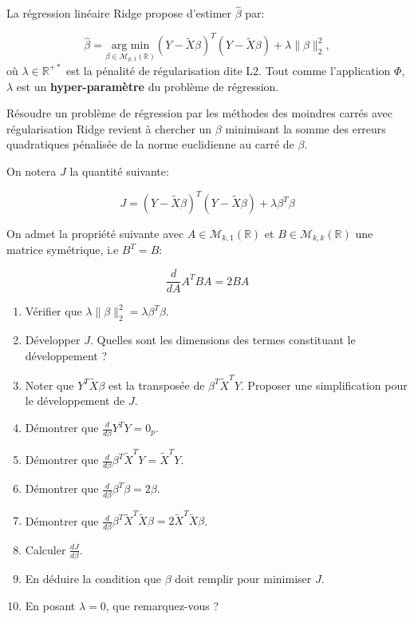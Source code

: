 \documentclass[solutions]{../exercices}
\begin{document}
La régression linéaire Ridge propose d'estimer $\hat{\beta}$ par:

\begin{equation}
	\hat{\beta} = \underset{\beta \in \mathcal{M}_{p,1}(\mathbb{R})}{\text{arg min}} \left(Y - \tilde{X}\beta\right)^T \left(Y - \tilde{X}\beta\right) + \lambda \| \beta \|_2^2,
	\label{eqn:ridge-1}
\end{equation}
où $\lambda \in \mathbb{R}^{+*}$ est la pénalité de régularisation dite L2. Tout comme l'application $\Phi$, $\lambda$ est un \textbf{hyper-paramètre} du problème de régression.

Résoudre un problème de régression par les méthodes des moindres carrés avec régularisation Ridge revient à chercher un $\beta$ minimisant la somme des erreurs quadratiques pénalisée de la norme euclidienne au carré de $\beta$.

\begin{exercice}

On notera $J$ la quantité suivante:

\begin{equation}
	J = \left(Y - \tilde{X}\beta\right)^T \left(Y - \tilde{X}\beta\right) + \lambda \beta^T \beta
	\nonumber
\end{equation}

On admet la propriété suivante avec $A \in \mathcal{M}_{k,1}(\mathbb{R})$ et $B \in \mathcal{M}_{k,k}(\mathbb{R})$ une matrice symétrique, i.e $B^T = B$:

\begin{equation}
	\frac{d}{dA} A^T B A = 2 B A
	\nonumber
\end{equation}

\begin{enumerate}
	\item Vérifier que $\lambda \| \beta \|_2^2 = \lambda \beta^T \beta$.
	\item Développer $J$. Quelles sont les dimensions des termes constituant le développement ?
	\item Noter que $Y^T\tilde{X}\beta$ est la transposée de $\beta^T \tilde{X}^T Y$. Proposer une simplification pour le développement de $J$.
	\item Démontrer que $\displaystyle \frac{d}{d\beta} Y^T Y = 0_p$.
	\item Démontrer que $\displaystyle \frac{d}{d\beta} \beta^T \tilde{X}^T Y = \tilde{X}^T Y$.
	\item Démontrer que $\displaystyle \frac{d}{d\beta} \beta^T \beta = 2 \beta$.
	\item Démontrer que $\displaystyle \frac{d}{d\beta} \beta^T \tilde{X}^T \tilde{X} \beta = 2 \tilde{X}^T \tilde{X} \beta$.
	\item Calculer $\displaystyle \frac{dJ}{d\beta}$.
	\item En déduire la condition que $\beta$ doit remplir pour minimiser $J$.
	\item En posant $\lambda = 0$, que remarquez-vous ?
\end{enumerate}

\end{exercice}
\end{document}
